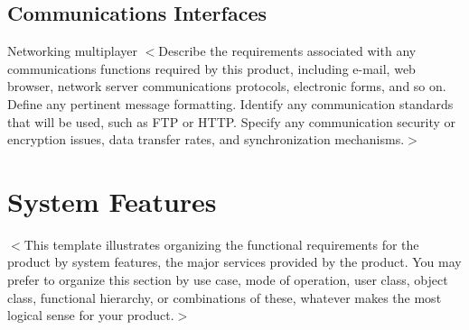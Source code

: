 \documentclass{scrreprt}
\begin{document}
\section{Communications Interfaces}
Networking multiplayer
$<$Describe the requirements associated with any communications functions 
required by this product, including e-mail, web browser, network server 
communications protocols, electronic forms, and so on. Define any pertinent 
message formatting. Identify any communication standards that will be used, such 
as FTP or HTTP. Specify any communication security or encryption issues, data 
transfer rates, and synchronization mechanisms.$>$


\chapter{System Features}
$<$This template illustrates organizing the functional requirements for the 
product by system features, the major services provided by the product. You may 
prefer to organize this section by use case, mode of operation, user class, 
object class, functional hierarchy, or combinations of these, whatever makes the 
most logical sense for your product.$>$


%

\end{document}

